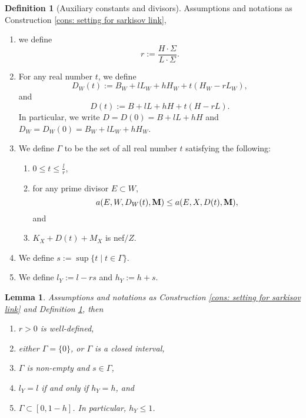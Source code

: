 \documentclass[11pt]{amsart}
\numberwithin{equation}{section}
\newcommand{\Mm}{{\bf{M}}}
\newcommand{\Ii}{\Gamma}
\newtheorem{lem}[thm]{Lemma}
\theoremstyle{definition}
\newtheorem{defn}[thm]{Definition}
\theoremstyle{definition}
\theoremstyle{definition}
\begin{document}
\begin{defn}[Auxiliary constants and divisors]\label{defn: auxiliary invariants}
Assumptions and notations as Construction \ref{cons: setting for sarkisov link},
\begin{enumerate}
    \item we define $$r:=\frac{H\cdot\Sigma}{L\cdot\Sigma}.$$
    \item For any real number $t$, we define
    $$D_W(t):=B_W+lL_W+hH_W+t(H_W-rL_W),$$ 
and 
$$D(t):=B+lL+hH+t(H-rL).$$
In particular, we write $D=D(0)=B+lL+hH$ and $D_{W}=D_{W}(0)=B_{W}+lL_{W}+hH_{W}$.
\item We define $\Gamma$ to be the set of all real number $t$ satisfying the following:
\begin{enumerate}
    \item $0\leq t\leq\frac{l}{r}$,
        \item for any prime divisor $E\subset W$,
    $$a(E,W,D_W(t),\Mm)\leq a(E,X,D(t),\Mm),$$
    and
    \item $K_X+D(t)+M_X$ is nef$/Z$.
\end{enumerate}
\item We define $s:=\sup\{t\mid t\in\Gamma\}$.
\item We define $l_Y:=l-rs$ and $h_Y:=h+s$.
\end{enumerate}
\end{defn}


\begin{lem}\label{lem: sarkisov h<=1}
Assumptions and notations as Construction \ref{cons: setting for sarkisov link} and Definition \ref{defn: auxiliary invariants}, then 
\begin{enumerate}
\item $r>0$ is well-defined,
    \item either $\Ii=\{0\}$, or $\Ii$ is a closed interval,
    \item $\Ii$ is non-empty and $s\in\Ii$, 
    \item $l_Y=l$ if and only if $h_Y=h$, and
    \item $\Ii\subset [0,1-h]$. In particular, $h_Y\leq 1$.
\end{enumerate}
\end{lem}
\end{document}
